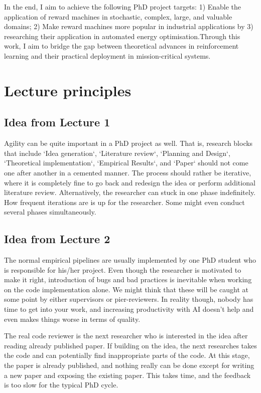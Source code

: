 \documentclass[a4paper,10pt]{article} %
\begin{document}
In the end, I aim to achieve the following PhD project targets: 1) Enable the application of reward machines in stochastic, complex, large, and valuable domains; 2) Make reward machines more popular in industrial applications by 3) researching their application in automated energy optimisation.Through this work, I aim to bridge the gap between theoretical advances in reinforcement learning and their practical deployment in mission-critical systems.

\section{Lecture principles}

\subsection{Idea from Lecture 1}

Agility can be quite important in a PhD project as well. That is, research blocks that include `Idea generation`, `Literature review`, `Planning and Design`, `Theoretical implementation`, `Empirical Results`, and `Paper` should not come one after another in a cemented manner. The process should rather be iterative, where it is completely fine to go back and redesign the idea or perform additional literature review. Alternatively, the researcher can stuck in one phase indefinitely. How frequent iterations are is up for the researcher. Some might even conduct several phases simultaneously.

\subsection{Idea from Lecture 2}

The normal empirical pipelines are usually implemented by one PhD student who is responsible for his/her project. Even though the researcher is motivated to make it right, introduction of bugs and bad practices is inevitable when working on the code implementation alone. We might think that these will be caught at some point by either supervisors or pier-reviewers. In reality though, nobody has time to get into your work, and increasing productivity with AI doesn't help and even makes things worse in terms of quality.

The real code reviewer is the next researcher who is interested in the idea after reading already published paper. If building on the idea, the next researches takes the code and can potentially find inappropriate parts of the code. At this stage, the paper is already published, and nothing really can be done except for writing a new paper and exposing the existing paper. This takes time, and the feedback is too slow for the typical PhD cycle.
\end{document}
